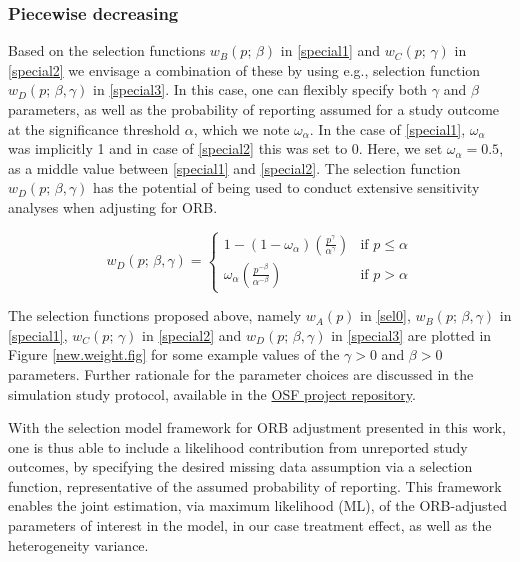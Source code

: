 \documentclass[twocolumn]{article}\usepackage[]{graphicx}\usepackage[]{xcolor}
\begin{document}
\bigskip

\subsubsection{Piecewise decreasing}

Based on the selection functions $w_B(p \text{; } \beta)$ in \eqref{special1} and $w_C(p \text{; } \gamma)$ in \eqref{special2} we  envisage a combination of these by using e.g., selection function $w_D(p \text{; } \beta, \gamma)$ in \eqref{special3}. In this case, one can flexibly specify both $\gamma$ and $\beta$ parameters, as well as the probability of reporting assumed for a study outcome at the significance threshold $\alpha$, which we note $\omega_{\alpha}$. In the case of \eqref{special1}, $\omega_{\alpha}$ was implicitly 1 and in case of \eqref{special2} this was set to 0. Here, we set $\omega_{\alpha}=0.5$, as a middle value between \eqref{special1} and \eqref{special2}. The selection function $w_D(p \text{; } \beta, \gamma)$ has the potential of being used to conduct extensive sensitivity analyses when adjusting for ORB.

\bigskip

\begin{equation}
w_D(p \text{; } \beta, \gamma) = 
\begin{cases}
1 - (1-\omega_{\alpha})\left(\frac{p^{\gamma}}{\alpha^{\gamma}}\right) & \text{if } p \leq \alpha \\
\omega_{\alpha}\left(\frac{p^{-\beta}}{\alpha^{-\beta}}\right) & \text{if } p > \alpha
\end{cases}
\label{special3}
\end{equation}

\bigskip

The selection functions proposed above, namely $w_A(p)$ in \eqref{sel0}, $w_B(p \text{; } \beta, \gamma)$ in \eqref{special1}, $w_C(p \text{; } \gamma)$ in \eqref{special2} and $w_D(p \text{; } \beta, \gamma)$ in \eqref{special3} are plotted in Figure \ref{new.weight.fig} for some example values of the $\gamma > 0$ and $\beta > 0$ parameters. Further rationale for the parameter choices are discussed in the simulation study protocol, available in the \href{https://osf.io/ancdu/}{OSF project repository}.

\bigskip

With the selection model framework for ORB adjustment presented in this work, one is thus able to include a likelihood contribution from unreported study outcomes, by specifying the desired missing data assumption via a selection function, representative of the assumed probability of reporting. This framework enables the joint estimation, via maximum likelihood (ML), of the ORB-adjusted parameters of interest in the model, in our case treatment effect, as well as the heterogeneity variance.
\end{document}
